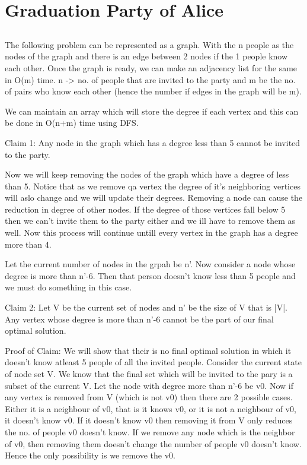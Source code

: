 \documentclass{article}
\begin{document}
\section{Graduation Party of Alice}

\subsection{}
The following problem can be represented as a graph. With the n people as the nodes of the graph and there is an edge between 2 nodes if the 1 people know each other. Once the graph is ready, we can make an adjacency list for the same in O(m) time. n -> no. of people that are invited to the party and m be the no. of pairs who know each other (hence the number if edges in the graph will be m).

We can maintain an array which will store the degree if each vertex and this can be done in O(n+m) time using DFS.

Claim 1: Any node in the graph which has a degree less than 5 cannot be invited to the party. 

Now we will keep removing the nodes of the graph which have a degree of less than 5. Notice that as we remove qa vertex the degree of it's neighboring vertices will aslo change and we will update their degrees. Removing a node can cause the reduction in degree of other nodes. If the degree of those vertices fall below 5 then we can't invite them to the party either and we ill have to remove them as well. Now this process will continue untill every vertex in the graph has a degree more than 4.

Let the current number of nodes in the grpah be n'. Now consider a node whose degree is more than n'-6. Then that person doesn't know less than 5 people and we must do something in this case. 

Claim 2: Let V be the current set of nodes and n' be the size of V that is |V|. Any vertex whose degree is more than n'-6 cannot be the part of our final optimal solution. 

Proof of Claim: We will show that their is no final optimal solution in which it doesn't know atleast 5 people of all the invited people. Consider the current state of node set V. We know that the final set which will be invited to the pary is a subset of the current V. Let the node with degree more than n'-6 be v0. Now if any vertex is removed from V (which is not v0) then there are 2 possible cases. Either it is a neighbour of v0, that is it knows v0, or it is not a neighbour of v0, it doesn't know v0. If it doesn't know v0 then removing it from V only reduces the no. of people v0 doesn't know. If we remove any node which is the neighbor of v0, then removing them doesn't change the number of people v0 doesn't know. Hence the only possibility is we remove the v0.
\end{document}
